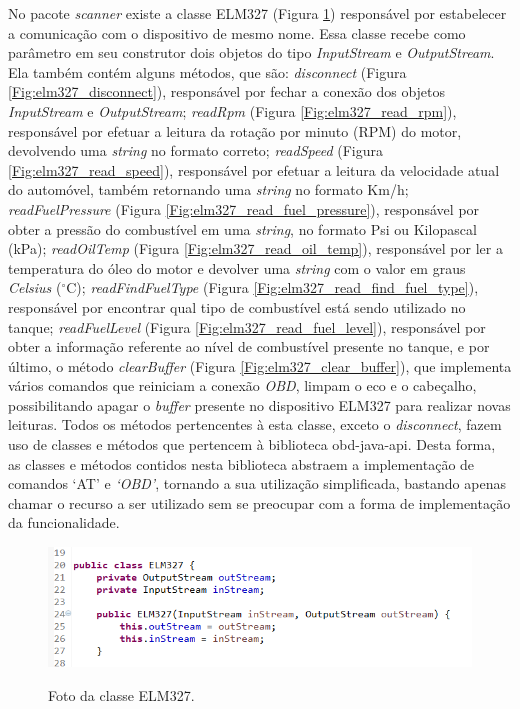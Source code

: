 No pacote \textit{scanner} existe a classe ELM327 (Figura \ref{Fig:elm327_class}) responsável por estabelecer a comunicação com o dispositivo de mesmo nome. Essa classe recebe como parâmetro em seu construtor dois objetos do tipo \textit{InputStream} e \textit{OutputStream}. Ela também contém alguns métodos, que são: \textit{disconnect} (Figura \ref{Fig:elm327_disconnect}), responsável por fechar a conexão dos objetos \textit{InputStream} e \textit{OutputStream}; \textit{readRpm} (Figura \ref{Fig:elm327_read_rpm}), responsável por efetuar a leitura da rotação por minuto (RPM) do motor, devolvendo uma \textit{string} no formato correto; \textit{readSpeed} (Figura \ref{Fig:elm327_read_speed}), responsável por efetuar a leitura da velocidade atual do automóvel, também retornando uma \textit{string} no formato Km/h; \textit{readFuelPressure} (Figura \ref{Fig:elm327_read_fuel_pressure}), responsável por obter a pressão do combustível em uma \textit{string}, no formato Psi ou Kilopascal (kPa); \textit{readOilTemp} (Figura \ref{Fig:elm327_read_oil_temp}), responsável por ler a temperatura do óleo do motor e devolver uma \textit{string} com o valor em graus \textit{Celsius} ($^{\circ}$C); \textit{readFindFuelType} (Figura \ref{Fig:elm327_read_find_fuel_type}), responsável por encontrar qual tipo de combustível está sendo utilizado no tanque; \textit{readFuelLevel} (Figura \ref{Fig:elm327_read_fuel_level}), responsável por obter a informação referente ao nível de combustível presente no tanque, e por último, o método \textit{clearBuffer} (Figura \ref{Fig:elm327_clear_buffer}), que implementa vários comandos que reiniciam a conexão \textit{OBD}, limpam o eco e o cabeçalho, possibilitando apagar o \textit{buffer} presente no dispositivo ELM327 para realizar novas leituras. Todos os métodos pertencentes à esta classe, exceto o \textit{disconnect}, fazem uso de classes e métodos que pertencem à biblioteca obd-java-api. Desta forma, as classes e métodos contidos nesta biblioteca abstraem a implementação de comandos ‘AT’ e \textit{‘OBD’}, tornando a sua utilização simplificada, bastando apenas chamar o recurso a ser utilizado sem se preocupar com a forma de implementação da funcionalidade.

\begin{figure}[!ht]
\centering
\caption{Foto da classe ELM327.} 
{\includegraphics[scale=.70]{imagens/pacoteScanner-ELM327.PNG}}\\
 \label{Fig:elm327_class}
\end{figure}

